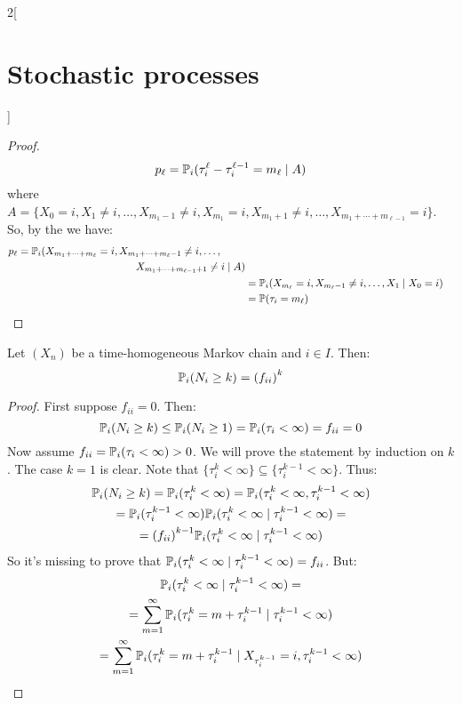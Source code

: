 \documentclass[../../../main_math.tex]{subfiles}
\begin{document}
\begin{multicols}{2}[\section{Stochastic processes}]
\begin{proof}
\begin{equation*}
      p_\ell=\mathbb{P}_i(\tau_i^{\ell}-\tau_i^{\ell-1}=m_\ell\mid A)
    \end{equation*}
    where $A=\{X_0=i,X_1\ne i, \ldots, X_{m_1-1}\ne i,X_{m_1}=i, X_{m_1+1}\ne i,\ldots, X_{m_1+\cdots+m_{\ell-1}}=i\}$. So, by the  we have:
    \begin{align*}
      \begin{split}
        p_\ell & =\Prob_i(X_{m_1+\cdots+m_\ell}=i,X_{m_1+\cdots+m_\ell-1}\ne i,\ldots, \\
               & \hspace{4cm}X_{m_1+\cdots+m_{\ell-1}+1}\ne i\mid A)
      \end{split} \\
       & =\Prob_i(X_{m_\ell}=i,X_{m_\ell-1}\ne i,\ldots,X_{1}\mid X_{0}=i)                                     \\
       & =\Prob(\tau_i=m_\ell)
    \end{align*}
  \end{proof}
  \begin{proposition}\label{SP:recurrence}
    Let $(X_n)$ be a time-homogeneous Markov chain and $i\in I$. Then:
    $$
      \mathbb{P}_i(N_i\geq k)={(f_{ii})}^k
    $$
  \end{proposition}
  \begin{proof}
    First suppose $f_{ii}=0$. Then:
    $$
      \mathbb{P}_i(N_i\geq k)\leq\mathbb{P}_i(N_i\geq 1)=\mathbb{P}_i(\tau_i<\infty)=f_{ii}=0
    $$
    Now assume $f_{ii}=\mathbb{P}_i(\tau_i<\infty)>0$. We will prove the statement by induction on $k$. The case $k=1$ is clear. Note that $\{\tau_i^k<\infty\}\subseteq \{\tau_i^{k-1}<\infty\}$. Thus:
    \begin{multline*}
      \mathbb{P}_i(N_i\geq k) =\mathbb{P}_i(\tau_i^k<\infty)=\mathbb{P}_i(\tau_i^k<\infty,\tau_i^{k-1}<\infty)\\=\mathbb{P}_i(\tau_i^{k-1}<\infty)\mathbb{P}_i(\tau_i^k<\infty\mid\tau_i^{k-1}<\infty)=\\={(f_{ii})}^{k-1}\mathbb{P}_i(\tau_i^k<\infty\mid\tau_i^{k-1}<\infty)
    \end{multline*}
    So it's missing to prove that $\mathbb{P}_i(\tau_i^k<\infty\mid\tau_i^{k-1}<\infty)={f_{ii}}$. But:
    \begin{multline*}
      \Prob_i(\tau_i^k<\infty\mid\tau_i^{k-1}<\infty)=\\=\sum_{m=1}^{\infty}\Prob_i(\tau_i^k=m+\tau_i^{k-1}\mid\tau_i^{k-1}<\infty)\\=\sum_{m=1}^{\infty}\Prob_i(\tau_i^k=m+\tau_i^{k-1}\mid X_{\tau_i^{k-1}}=i,\tau_i^{k-1}<\infty)

\end{multline*}
\end{proof}
\end{multicols}
\end{document}
